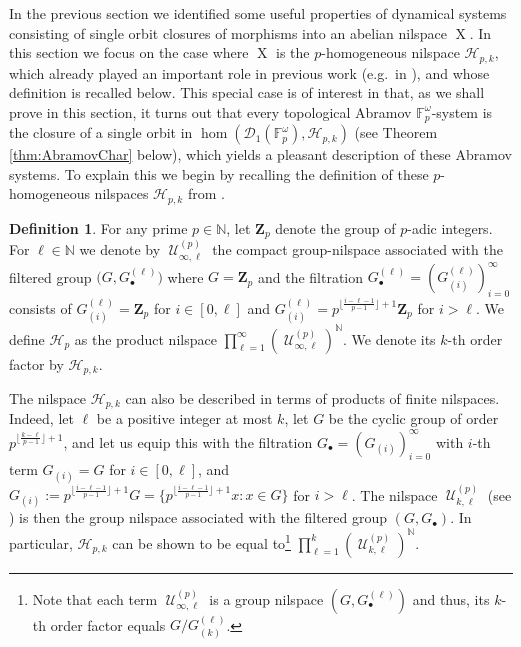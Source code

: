 \documentclass[a4paper,12pt,reqno]{amsart}
\theoremstyle{definition}
\newtheorem{defn}[theorem]{Definition}
\newcommand{\mc}{\mathcal}
\newcommand{\mf}{\mathbf}
\newcommand{\mb}{\mathbb}
\DeclareMathOperator{\ns}{X}
\DeclareMathOperator{\abph}{\mc{U}}
\begin{document}
\noindent In the previous section we identified some useful properties of dynamical systems consisting of single orbit closures of morphisms into an abelian nilspace $\ns$. In this section we focus on the case where $\ns$ is the $p$-homogeneous nilspace $\mc{H}_{p,k}$, which already played an important role in previous work (e.g.\ in \cite{CGSS-aff-ex}), and whose definition is recalled below. This special case is of interest in that, as we shall prove in this section, it turns out that every topological Abramov $\mb{F}_p^\omega$-system is the closure of a single orbit in $\hom(\mc{D}_1(\mb{F}_p^\omega),\mc{H}_{p,k})$ (see Theorem \ref{thm:AbramovChar} below), which yields a pleasant description of these Abramov systems. To explain this we begin by recalling the definition of these $p$-homogeneous nilspaces $\mc{H}_{p,k}$ from \cite[Definition 4.2]{CGSS-aff-ex}. 

\begin{defn}
For any prime $p\in \mb{N}$, let $\mf{Z}_p$ denote the group of $p$-adic integers. For $\ell\in\mb{N}$ we denote by $\abph^{(p)}_{\infty,\ell}$ the compact group-nilspace associated with the filtered group  $\big(G, G_\bullet^{(\ell)}\big)$ where $G= \mf{Z}_p$ and the filtration $G_\bullet^{(\ell)}=(G_{(i)}^{(\ell)})_{i=0}^{\infty}$ consists of $G_{(i)}^{(\ell)}= \mf{Z}_p$ for $i\in[0,\ell]$ and $G_{(i)}^{(\ell)}=p^{\lfloor\frac{i-{\ell}-1}{p-1}\rfloor+1}\mf{Z}_p$ for $i>\ell$. We define $\mc{H}_p$ as the product nilspace $\prod_{\ell=1}^{\infty}(\abph^{(p)}_{\infty,\ell})^{\mb{N}}$. We denote its $k$-th order factor by $\mc{H}_{p,k}$.
\end{defn}

\noindent The nilspace $\mc{H}_{p,k}$ can also be described in terms of products of finite nilspaces. Indeed, let $\ell$ be a positive integer at most $k$, let $G$ be the cyclic group of order $p^{\lfloor \frac{k-{\ell}}{p-1}\rfloor+1}$, and let us equip this with  the filtration $G_\bullet=(G_{(i)})_{i=0}^{\infty}$ with $i$-th term $G_{(i)}=G$ for $i\in [0,\ell]$, and $G_{(i)}:=p^{\lfloor\frac{i-{\ell}-1}{p-1}\rfloor+1}G=\{p^{\lfloor\frac{i-{\ell}-1}{p-1}\rfloor+1}x:x\in G\}$ for $i>\ell$. The nilspace $\abph_{k,{\ell}}^{(p)}$ (see \cite[Definition 1.6]{CGSS-p-hom}) is then the group nilspace associated with the filtered group $(G,G_\bullet)$. In particular, $\mc{H}_{p,k}$ can be shown to be equal to\footnote{ Note that each term $\abph^{(p)}_{\infty,\ell}$ is a group nilspace $(G,G_\bullet^{(\ell)})$ and thus, its $k$-th order factor equals $G/G_{(k)}^{(\ell)}$. }  $\prod_{\ell=1}^{k}(\abph^{(p)}_{k,\ell})^{\mb{N}}$.
\end{document}
